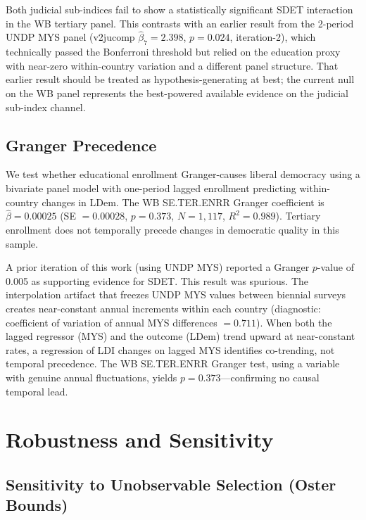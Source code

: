 \documentclass[11pt,letterpaper]{article}
\begin{document}
Both judicial sub-indices fail to show a statistically significant SDET interaction in the WB
tertiary panel. This contrasts with an earlier result from the 2-period UNDP MYS panel (v2jucomp
$\hat{\beta}_7 = 2.398$, $p = 0.024$, iteration-2), which technically passed the Bonferroni
threshold but relied on the education proxy with near-zero within-country variation and a different
panel structure. That earlier result should be treated as hypothesis-generating at best; the
current null on the WB panel represents the best-powered available evidence on the judicial
sub-index channel.

\subsection{Granger Precedence}

We test whether educational enrollment Granger-causes liberal democracy \citep{Granger1969} using a
bivariate panel model with one-period lagged enrollment predicting within-country changes in LDem.
The WB SE.TER.ENRR Granger coefficient is $\hat{\beta} = 0.00025$ (SE $= 0.00028$, $p = 0.373$,
$N = 1{,}117$, $R^2 = 0.989$). Tertiary enrollment does not temporally precede changes in
democratic quality in this sample.

A prior iteration of this work (using UNDP MYS) reported a Granger $p$-value of 0.005 as
supporting evidence for SDET. This result was spurious. The interpolation artifact that freezes
UNDP MYS values between biennial surveys creates near-constant annual increments within each
country (diagnostic: coefficient of variation of annual MYS differences $= 0.711$). When both the
lagged regressor (MYS) and the outcome (LDem) trend upward at near-constant rates, a regression of
LDI changes on lagged MYS identifies co-trending, not temporal precedence. The WB SE.TER.ENRR
Granger test, using a variable with genuine annual fluctuations, yields $p = 0.373$---confirming
no causal temporal lead.

\section{Robustness and Sensitivity}
\label{sec:robustness}

\subsection{Sensitivity to Unobservable Selection (Oster Bounds)}
\end{document}
